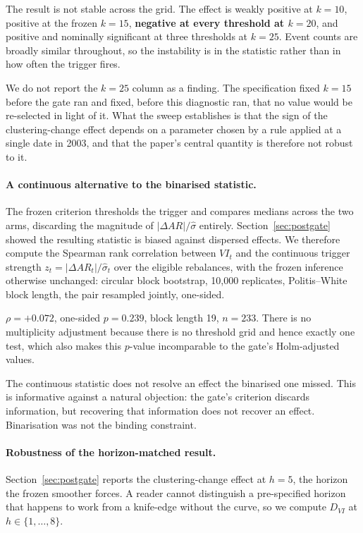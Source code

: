 \documentclass[12pt,letterpaper]{article}
\begin{document}
The result is not stable across the grid. The effect is weakly positive at $k = 10$,
positive at the frozen $k = 15$, \textbf{negative at every threshold at $k = 20$}, and
positive and nominally significant at three thresholds at $k = 25$. Event counts are
broadly similar throughout, so the instability is in the statistic rather than in how
often the trigger fires.

We do not report the $k = 25$ column as a finding. The specification fixed $k = 15$
before the gate ran and fixed, before this diagnostic ran, that no value would be
re-selected in light of it. What the sweep establishes is that the sign of the
clustering-change effect depends on a parameter chosen by a rule applied at a single
date in 2003, and that the paper's central quantity is therefore not robust to it.

\paragraph{A continuous alternative to the binarised statistic.}
The frozen criterion thresholds the trigger and compares medians across the two arms,
discarding the magnitude of $|\Delta AR|/\hat{\sigma}$ entirely.
Section~\ref{sec:postgate} showed the resulting statistic is biased against dispersed
effects. We therefore compute the Spearman rank correlation between $VI_t$ and the
continuous trigger strength $z_t = |\Delta AR_t| / \hat{\sigma}_t$ over the eligible
rebalances, with the frozen inference otherwise unchanged: circular block bootstrap,
10{,}000 replicates, Politis--White block length, the pair resampled jointly, one-sided.

$\rho = +0.072$, one-sided $p = 0.239$, block length 19, $n = 233$. There is no
multiplicity adjustment because there is no threshold grid and hence exactly one test,
which also makes this $p$-value incomparable to the gate's Holm-adjusted values.

The continuous statistic does not resolve an effect the binarised one missed. This is
informative against a natural objection: the gate's criterion discards information, but
recovering that information does not recover an effect. Binarisation was not the binding
constraint.

\paragraph{Robustness of the horizon-matched result.}
Section~\ref{sec:postgate} reports the clustering-change effect at $h = 5$, the horizon
the frozen smoother forces. A reader cannot distinguish a pre-specified horizon that
happens to work from a knife-edge without the curve, so we compute $D_{VI}$ at
$h \in \{1, \dots, 8\}$.
\end{document}
